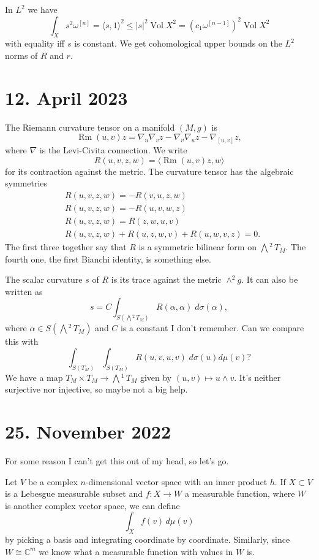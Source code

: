 \documentclass[11pt]{article}
\theoremstyle{definition}
\newcommand{\kk}[1]{\mathbb{#1}}
\def\^#1{^{[#1]}}
\DeclareMathOperator{\Vol}{Vol}
\DeclareMathOperator{\Rm}{Rm}
\newcommand{\ext}[1]{\bigwedge{}^{\!\!#1}\,}
\def\<{\langle}
\def\>{\rangle}
\begin{document}
In $L^2$ we have
$$
\int_X s^2 \omega\^n
= \< s, 1 \>^2 \leq |s|^2 \Vol X^2
= (c_1 \omega\^{n-1})^2 \Vol X^2
$$
with equality iff $s$ is constant.
We get cohomological upper bounds on the $L^2$ norms of $R$ and $r$.


\section{12. April 2023}

The Riemann curvature tensor on a manifold $(M,g)$ is
$$
\Rm(u,v) z = \nabla_u \nabla_v z - \nabla_v \nabla_u z - \nabla_{[u,v]} z,
$$
where $\nabla$ is the Levi-Civita connection.
We write
$$
R(u,v,z,w) = \< \Rm(u,v)z, w \>
$$
for its contraction against the metric.
The curvature tensor has the algebraic symmetries
\begin{align*}
&R(u,v,z,w) = - R(v,u,z,w)
\\
&R(u,v,z,w) = - R(u,v,w,z)
\\
&R(u,v,z,w) = R(z,w,u,v)
\\
&R(u,v,z,w) + R(u,z,w,v) + R(u,w,v,z) = 0.
\end{align*}
The first three together say that $R$ is a symmetric bilinear form on
$\ext{2}{T_M}$.
The fourth one, the first Bianchi identity, is something else.

The scalar curvature $s$ of $R$ is its trace against the metric $\wedge^2 g$.
It can also be written as
$$
s = C \int_{S(\ext{2}T_M)} R(\alpha, \alpha) \; d\sigma(\alpha),
$$
where $\alpha \in S(\ext{2}T_M)$ and $C$ is a constant I don't remember.
Can we compare this with
$$
\int_{S(T_M)} \int_{S(T_M)} R(u,v,u,v) \; d\sigma(u) d\mu(v) ?
$$
We have a map $T_M \times T_M \to \ext{1}T_M$ given by $(u,v) \mapsto u \wedge v$.
It's neither surjective nor injective, so maybe not a big help.



\section{25. November 2022}

For some reason I can't get this out of my head, so let's go.

Let $V$ be a complex $n$-dimensional vector space with an inner product $h$.
If $X \subset V$ is a Lebesgue measurable subset and $f : X \to W$ a measurable
function, where $W$ is another complex vector space, we can define
$$
\int_X f(v) \, d\mu(v)
$$
by picking a basis and integrating coordinate by coordinate.
Similarly, since $W \cong \kk C^m$ we know what a measurable function with
values in $W$ is.
\end{document}

